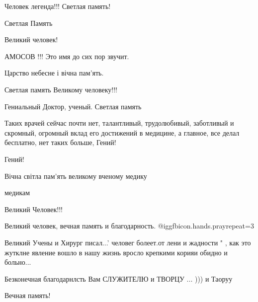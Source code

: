 \begin{itemize}
Человек легенда!!! Светлая память!


Светлая Память

Великий человек!

АМОСОВ !!! Это имя до сих пор звучит.

Царство небесне і вічна пам'ять.

Светлая память Великому человеку!!!

Гениальный Доктор, ученый. Светлая память


Таких врачей сейчас почти нет, талантливый, трудолюбивый, заботливый и
скромный, огромный вклад его достижений в медицине, а главное, все делал
бесплатно, нет таких больше, Гений!


Гений!

Вічна світла пам'ять великому вченому медику

медикам

Великий Человек!!!

Великий человек, вечная память и благодарность. @igg{fbicon.hands.pray}{repeat=3} 


Великий Учены и Хирург писал...' человег болеет.от лени и жадности " , как это
жутклне явление вошло в нашу жизнь вросло крепкими корияи
обидно и больно...

Безконечная благодарнлсть Вам СЛУЖИТЕЛЮ и ТВОРЦУ ... )))
и Таоруу

Вечная память!



\end{itemize} %
